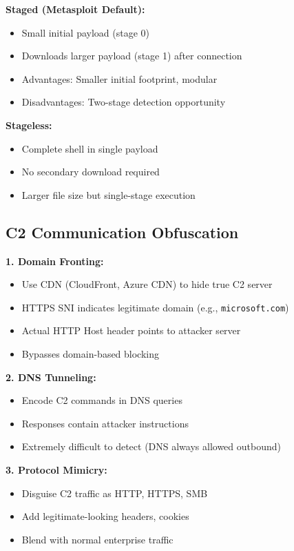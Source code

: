 \documentclass[11pt,conference]{IEEEtran}
\begin{document}
\textbf{Staged (Metasploit Default):}
\begin{itemize}
    \item Small initial payload (stage 0)
    \item Downloads larger payload (stage 1) after connection
    \item Advantages: Smaller initial footprint, modular
    \item Disadvantages: Two-stage detection opportunity
\end{itemize}

\textbf{Stageless:}
\begin{itemize}
    \item Complete shell in single payload
    \item No secondary download required
    \item Larger file size but single-stage execution
\end{itemize}

\subsection{C2 Communication Obfuscation}

\textbf{1. Domain Fronting:}
\begin{itemize}
    \item Use CDN (CloudFront, Azure CDN) to hide true C2 server
    \item HTTPS SNI indicates legitimate domain (e.g., \texttt{microsoft.com})
    \item Actual HTTP Host header points to attacker server
    \item Bypasses domain-based blocking
\end{itemize}

\textbf{2. DNS Tunneling:}
\begin{itemize}
    \item Encode C2 commands in DNS queries
    \item Responses contain attacker instructions
    \item Extremely difficult to detect (DNS always allowed outbound)
\end{itemize}

\textbf{3. Protocol Mimicry:}
\begin{itemize}
    \item Disguise C2 traffic as HTTP, HTTPS, SMB
    \item Add legitimate-looking headers, cookies
    \item Blend with normal enterprise traffic
\end{itemize}
\end{document}
